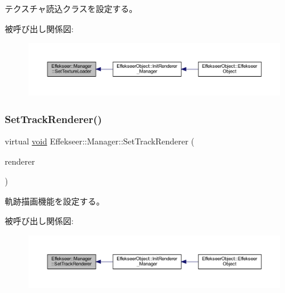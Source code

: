 テクスチャ読込クラスを設定する。 

被呼び出し関係図\+:\nopagebreak
\begin{figure}[H]
\begin{center}
\leavevmode
\includegraphics[width=350pt]{class_effekseer_1_1_manager_a35915c6406f06e7502abed5eeba6ee51_icgraph}
\end{center}
\end{figure}
\mbox{\label{class_effekseer_1_1_manager_a7bff3a7ec23d6ae4a66b6f6ba4bd58fc}} 
\subsubsection{\texorpdfstring{Set\+Track\+Renderer()}{SetTrackRenderer()}}
{\footnotesize\ttfamily virtual \mbox{\hyperlink{namespace_effekseer_ab34c4088e512200cf4c2716f168deb56}{void}} Effekseer\+::\+Manager\+::\+Set\+Track\+Renderer (\begin{DoxyParamCaption}\item[{\mbox{\hyperlink{class_effekseer_1_1_track_renderer}{Track\+Renderer}} $\ast$}]{renderer }\end{DoxyParamCaption})\hspace{0.3cm}{\ttfamily [pure virtual]}}



軌跡描画機能を設定する。 

被呼び出し関係図\+:\nopagebreak
\begin{figure}[H]
\begin{center}
\leavevmode
\includegraphics[width=350pt]{class_effekseer_1_1_manager_a7bff3a7ec23d6ae4a66b6f6ba4bd58fc_icgraph}
\end{center}
\end{figure}
\mbox{\label{class_effekseer_1_1_manager_a65a6043aace92f52bcb8f7fc1052d3f0}} 
